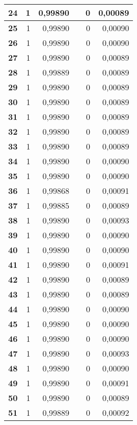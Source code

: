 \begin{longtable}{|r|r|r|l|r|r|}
\textbf{24} & 1 & 0,99890 &  & 0 & 0,00089 \\ \hline
\textbf{25} & 1 & 0,99890 &  & 0 & 0,00090 \\ \hline
\textbf{26} & 1 & 0,99890 &  & 0 & 0,00090 \\ \hline
\textbf{27} & 1 & 0,99890 &  & 0 & 0,00089 \\ \hline
\textbf{28} & 1 & 0,99889 &  & 0 & 0,00089 \\ \hline
\textbf{29} & 1 & 0,99890 &  & 0 & 0,00089 \\ \hline
\textbf{30} & 1 & 0,99890 &  & 0 & 0,00089 \\ \hline
\textbf{31} & 1 & 0,99890 &  & 0 & 0,00089 \\ \hline
\textbf{32} & 1 & 0,99890 &  & 0 & 0,00089 \\ \hline
\textbf{33} & 1 & 0,99890 &  & 0 & 0,00089 \\ \hline
\textbf{34} & 1 & 0,99890 &  & 0 & 0,00090 \\ \hline
\textbf{35} & 1 & 0,99890 &  & 0 & 0,00090 \\ \hline
\textbf{36} & 1 & 0,99868 &  & 0 & 0,00091 \\ \hline
\textbf{37} & 1 & 0,99885 &  & 0 & 0,00089 \\ \hline
\textbf{38} & 1 & 0,99890 &  & 0 & 0,00093 \\ \hline
\textbf{39} & 1 & 0,99890 &  & 0 & 0,00090 \\ \hline
\textbf{40} & 1 & 0,99890 &  & 0 & 0,00090 \\ \hline
\textbf{41} & 1 & 0,99890 &  & 0 & 0,00091 \\ \hline
\textbf{42} & 1 & 0,99890 &  & 0 & 0,00089 \\ \hline
\textbf{43} & 1 & 0,99890 &  & 0 & 0,00089 \\ \hline
\textbf{44} & 1 & 0,99890 &  & 0 & 0,00090 \\ \hline
\textbf{45} & 1 & 0,99890 &  & 0 & 0,00090 \\ \hline
\textbf{46} & 1 & 0,99890 &  & 0 & 0,00090 \\ \hline
\textbf{47} & 1 & 0,99890 &  & 0 & 0,00093 \\ \hline
\textbf{48} & 1 & 0,99890 &  & 0 & 0,00090 \\ \hline
\textbf{49} & 1 & 0,99890 &  & 0 & 0,00091 \\ \hline
\textbf{50} & 1 & 0,99890 &  & 0 & 0,00089 \\ \hline
\textbf{51} & 1 & 0,99889 &  & 0 & 0,00092 \\ \hline

\end{longtable}
